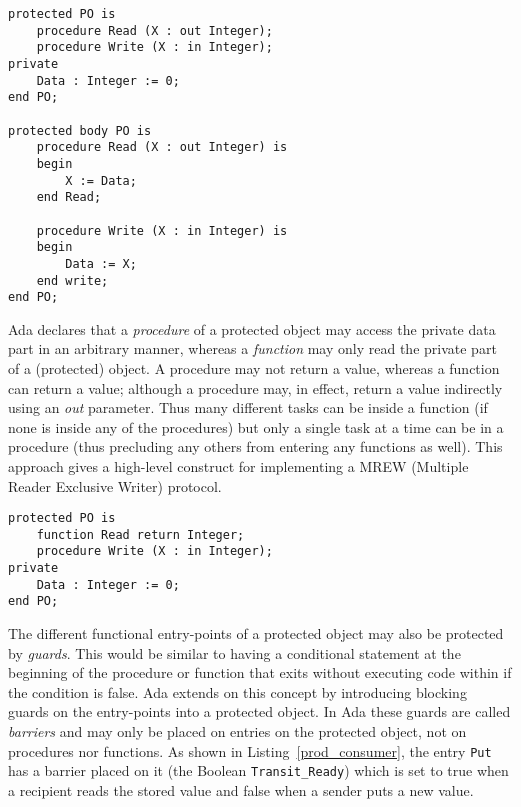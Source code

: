 \begin{minipage}{\listingwidth}
\lstset{language=ada}
\begin{lstlisting}[caption=Declaring a protected object with
    procedures.,label=po_procs]
protected PO is
	procedure Read (X : out Integer);
	procedure Write (X : in Integer);
private
	Data : Integer := 0;
end PO;

protected body PO is
	procedure Read (X : out Integer) is
	begin
		X := Data;
	end Read;

	procedure Write (X : in Integer) is
	begin
		Data := X;
	end write;
end PO;
\end{lstlisting}
\end{minipage}

Ada declares that a \emph{procedure} of a protected object may access
the private data part in an arbitrary manner, whereas a
\emph{function} may only read the private part of a (protected)
object. A procedure may not return a value, whereas a function can
return a value; although a procedure may, in effect, return a value
indirectly using an \emph{out} parameter. Thus many different tasks
can be inside a function (if none is inside any of the procedures) but
only a single task at a time can be in a procedure (thus precluding
any others from entering any functions as well). This approach gives a
high-level construct for implementing a MREW (Multiple Reader
Exclusive Writer) protocol.

\begin{minipage}{\listingwidth}
\lstset{language=ada}
\begin{lstlisting}[caption=Same protected object but with a function
    for improved parallelism.,label=po_proc_and_func]
protected PO is
	function Read return Integer;
	procedure Write (X : in Integer);
private
	Data : Integer := 0;
end PO;
\end{lstlisting}
\end{minipage}

The different functional entry-points of a protected object may also
be protected by \emph{guards}. This would be similar to having a
conditional statement at the beginning of the procedure or function
that exits without executing code within if the condition is
false. Ada extends on this concept by introducing blocking guards on
the entry-points into a protected object. In Ada these guards are
called \emph{barriers} and may only be placed on entries on the
protected object, not on procedures nor functions. As shown in
Listing~\ref{prod_consumer}, the entry \texttt{Put} has a barrier
placed on it (the Boolean \texttt{Transit\_Ready}) which is set to
true when a recipient reads the stored value and false when a sender
puts a new value.

